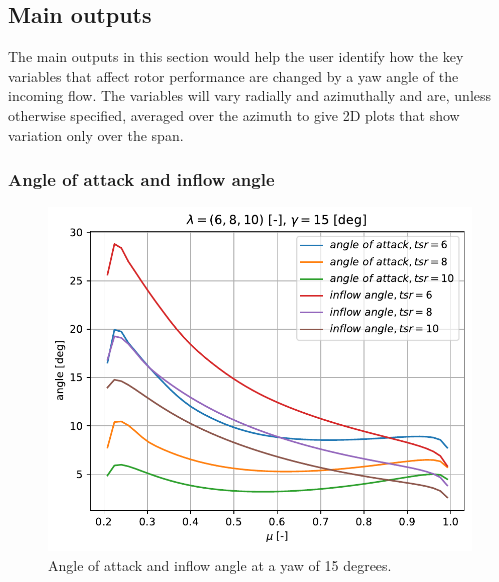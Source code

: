 \subsection{Main outputs}

The main outputs in this section would help the user identify how the key variables that affect rotor performance are changed by a yaw angle of the incoming flow. The variables will vary radially and azimuthally and are, unless otherwise specified, averaged over the azimuth to give 2D plots that show variation only over the span.

\subsubsection{\textbf{Angle of attack and inflow angle} }
\begin{figure}[htbp]
	\centering
	\includegraphics[height=0.45\textheight]{./img/yaw/alpha_phi-yaw_15.pdf}
	\caption{Angle of attack and inflow angle at a yaw of 15 degrees.}
	\label{img:yaw-aoa-15}
\end{figure}
